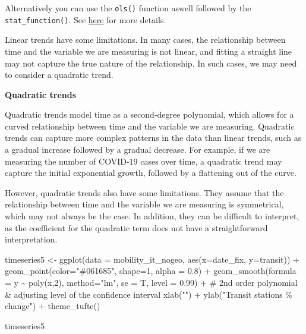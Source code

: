 \documentclass[
  letterpaper,
  DIV=11,
  numbers=noendperiod]{scrreprt}
\newenvironment{Shaded}{\begin{snugshade}}{\end{snugshade}}
\newcommand{\AttributeTok}[1]{\textcolor[rgb]{0.40,0.45,0.13}{#1}}
\newcommand{\CommentTok}[1]{\textcolor[rgb]{0.37,0.37,0.37}{#1}}
\newcommand{\DecValTok}[1]{\textcolor[rgb]{0.68,0.00,0.00}{#1}}
\newcommand{\FloatTok}[1]{\textcolor[rgb]{0.68,0.00,0.00}{#1}}
\newcommand{\FunctionTok}[1]{\textcolor[rgb]{0.28,0.35,0.67}{#1}}
\newcommand{\NormalTok}[1]{\textcolor[rgb]{0.00,0.23,0.31}{#1}}
\newcommand{\OtherTok}[1]{\textcolor[rgb]{0.00,0.23,0.31}{#1}}
\newcommand{\SpecialCharTok}[1]{\textcolor[rgb]{0.37,0.37,0.37}{#1}}
\newcommand{\StringTok}[1]{\textcolor[rgb]{0.13,0.47,0.30}{#1}}
\begin{document}
Alternatively you can use the \texttt{ols()} function aswell followed by
the \texttt{stat\_function()}. See
\href{https://edrub.in/ARE212/Spring2017/section06.html}{here} for more
details.

Linear trends have some limitations. In many cases, the relationship
between time and the variable we are measuring is not linear, and
fitting a straight line may not capture the true nature of the
relationship. In such cases, we may need to consider a quadratic trend.

\textbf{Quadratic trends}

Quadratic trends model time as a second-degree polynomial, which allows
for a curved relationship between time and the variable we are
measuring. Quadratic trends can capture more complex patterns in the
data than linear trends, such as a gradual increase followed by a
gradual decrease. For example, if we are measuring the number of
COVID-19 cases over time, a quadratic trend may capture the initial
exponential growth, followed by a flattening out of the curve.

However, quadratic trends also have some limitations. They assume that
the relationship between time and the variable we are measuring is
symmetrical, which may not always be the case. In addition, they can be
difficult to interpret, as the coefficient for the quadratic term does
not have a straightforward interpretation.

\begin{Shaded}
\begin{Highlighting}[]
\NormalTok{timeseries5 }\OtherTok{\textless{}{-}} \FunctionTok{ggplot}\NormalTok{(}\AttributeTok{data =}\NormalTok{ mobility\_it\_nogeo, }\FunctionTok{aes}\NormalTok{(}\AttributeTok{x=}\NormalTok{date\_fix, }\AttributeTok{y=}\NormalTok{transit)) }\SpecialCharTok{+}
  \FunctionTok{geom\_point}\NormalTok{(}\AttributeTok{color=}\StringTok{"\#061685"}\NormalTok{, }\AttributeTok{shape=}\DecValTok{1}\NormalTok{, }\AttributeTok{alpha =} \FloatTok{0.8}\NormalTok{) }\SpecialCharTok{+} 
  \FunctionTok{geom\_smooth}\NormalTok{(}\AttributeTok{formula =}\NormalTok{ y }\SpecialCharTok{\textasciitilde{}} \FunctionTok{poly}\NormalTok{(x,}\DecValTok{2}\NormalTok{), }\AttributeTok{method=}\StringTok{"lm"}\NormalTok{, }\AttributeTok{se =}\NormalTok{ T, }\AttributeTok{level =} \FloatTok{0.99}\NormalTok{) }\SpecialCharTok{+} \CommentTok{\# 2nd order polynomial \& adjusting level of the confidence interval}
  \FunctionTok{xlab}\NormalTok{(}\StringTok{""}\NormalTok{) }\SpecialCharTok{+}
  \FunctionTok{ylab}\NormalTok{(}\StringTok{"Transit stations \% change"}\NormalTok{) }\SpecialCharTok{+}
 \FunctionTok{theme\_tufte}\NormalTok{() }
  
\NormalTok{timeseries5}
\end{Highlighting}
\end{Shaded}
\end{document}
